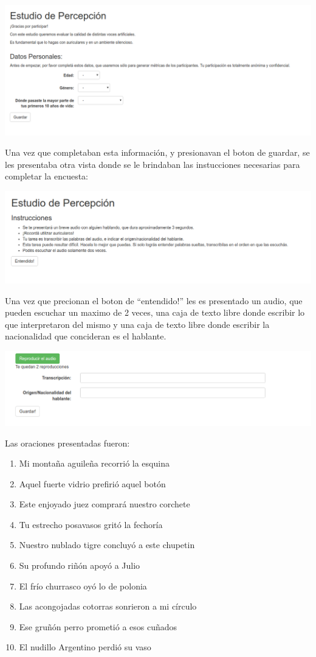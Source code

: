 \includegraphics[scale=0.5]{estudio_online/estudio1.png}

Una vez que completaban esta información, y presionavan el boton de guardar, se les presentaba otra vista donde se le brindaban las instucciones necesarias para completar la encuesta:

\includegraphics[scale=0.5]{estudio_online/estudio2.png}

Una vez que precionan el boton de ``entendido!'' les es presentado un audio, que pueden escuchar un maximo de 2 veces, una caja de texto libre donde escribir lo que interpretaron del mismo y una caja de texto libre donde escribir la nacionalidad que concideran es el hablante.

\includegraphics[scale=0.5]{estudio_online/estudio3.png}


Las oraciones presentadas fueron:

\begin{enumerate}
\item Mi montaña aguileña recorrió la esquina
\item Aquel fuerte vidrio prefirió aquel botón
\item Este enjoyado juez comprará nuestro corchete
\item Tu estrecho posavasos gritó la fechoría
\item Nuestro nublado tigre concluyó a este chupetin
\item Su profundo riñón apoyó a Julio
\item El frío churrasco oyó lo de polonia
\item Las acongojadas cotorras sonrieron a mi círculo
\item Ese gruñón perro prometió a esos cuñados
\item El nudillo Argentino perdió su vaso
\end{enumerate}



